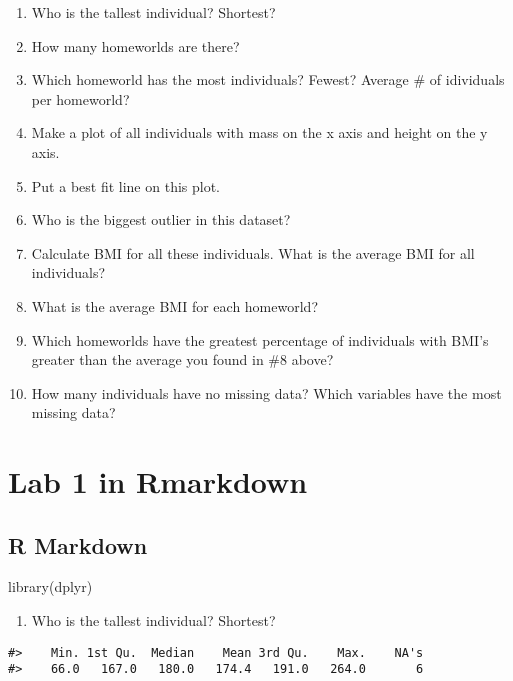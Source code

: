 \documentclass[
]{book}
\newenvironment{Shaded}{\begin{snugshade}}{\end{snugshade}}
\newcommand{\FunctionTok}[1]{\textcolor[rgb]{0.00,0.00,0.00}{#1}}
\newcommand{\NormalTok}[1]{#1}
\providecommand{\tightlist}{%
  \setlength{\itemsep}{0pt}\setlength{\parskip}{0pt}}
\begin{document}
\begin{enumerate}
\def\labelenumi{\arabic{enumi}.}
\tightlist
\item
  Who is the tallest individual? Shortest?
\item
  How many homeworlds are there?
\item
  Which homeworld has the most individuals? Fewest? Average \# of idividuals per homeworld?
\item
  Make a plot of all individuals with mass on the x axis and height on the y axis.
\item
  Put a best fit line on this plot.
\item
  Who is the biggest outlier in this dataset?
\item
  Calculate BMI for all these individuals. What is the average BMI for all individuals?
\item
  What is the average BMI for each homeworld?
\item
  Which homeworlds have the greatest percentage of individuals with BMI's greater than the average you found in \#8 above?
\item
  How many individuals have no missing data? Which variables have the most missing data?
\end{enumerate}

\hypertarget{lab-1-in-rmarkdown}{%
\chapter{Lab 1 in Rmarkdown}\label{lab-1-in-rmarkdown}}

\hypertarget{r-markdown}{%
\section{R Markdown}\label{r-markdown}}

\begin{Shaded}
\begin{Highlighting}[]
\FunctionTok{library}\NormalTok{(dplyr)}
\end{Highlighting}
\end{Shaded}

\begin{enumerate}
\def\labelenumi{\arabic{enumi}.}
\tightlist
\item
  Who is the tallest individual? Shortest?
\end{enumerate}

\begin{verbatim}
#>    Min. 1st Qu.  Median    Mean 3rd Qu.    Max.    NA's 
#>    66.0   167.0   180.0   174.4   191.0   264.0       6
\end{verbatim}
\end{document}
